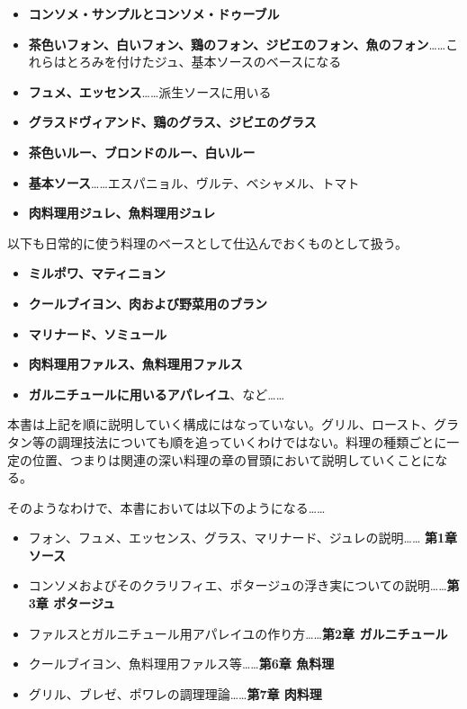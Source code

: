 \begin{main}
\begin{itemize}
\tightlist
\item
  \textbf{コンソメ・サンプルとコンソメ・ドゥーブル}
\item
  \textbf{茶色いフォン、白いフォン、鶏のフォン、ジビエのフォン、魚のフォン}\ldots{}\ldots{}これらはとろみを付けたジュ、基本ソースのベースになる
\item
  \textbf{フュメ、エッセンス}\ldots{}\ldots{}派生ソースに用いる
\item
  \textbf{グラスドヴィアンド、鶏のグラス、ジビエのグラス}
\item
  \textbf{茶色いルー、ブロンドのルー、白いルー}
\item
  \textbf{基本ソース}\ldots{}\ldots{}エスパニョル、ヴルテ、ベシャメル、トマト
\item
  \textbf{肉料理用ジュレ、魚料理用ジュレ}
\end{itemize}

\vspace{1\zw}

以下も日常的に使う料理のベースとして仕込んでおくものとして扱う。

\begin{itemize}
\tightlist
\item
  \textbf{ミルポワ、マティニョン}
\item
  \textbf{クールブイヨン、肉および野菜用のブラン}
\item
  \textbf{マリナード、ソミュール}
\item
  \textbf{肉料理用ファルス、魚料理用ファルス}
\item
  \textbf{ガルニチュールに用いるアパレイユ}、など\ldots{}\ldots{}
\end{itemize}

\vspace{1\zw}

本書は上記を順に説明していく構成にはなっていない。グリル、ロースト、グラタン等の調理技法についても順を追っていくわけではない。料理の種類ごとに一定の位置、つまりは関連の深い料理の章の冒頭において説明していくことになる。

\vspace{1\zw}

そのようなわけで、本書においては以下のようになる\ldots{}\ldots{}

\begin{itemize}
\tightlist
\item
  フォン、フュメ、エッセンス、グラス、マリナード、ジュレの説明\ldots{}\ldots{}
  \textbf{ 第1章 ソース}
\item
  コンソメおよびそのクラリフィエ、ポタージュの浮き実についての説明\ldots{}\ldots{}\textbf{第3章
  ポタージュ}
\item
  ファルスとガルニチュール用アパレイユの作り方\ldots{}\ldots{}\textbf{第2章
  ガルニチュール}
\item
  クールブイヨン、魚料理用ファルス等\ldots{}\ldots{}\textbf{第6章
  魚料理}
\item
  グリル、ブレゼ、ポワレの調理理論\ldots{}\ldots{}\textbf{第7章 肉料理}
\end{itemize}


\end{main}
